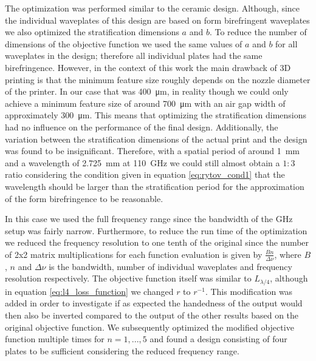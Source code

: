 The optimization was performed similar to the ceramic design. Although, since the individual waveplates of this design are based on form birefringent waveplates we also optimized the stratification dimensions $a$ and $b$. To reduce the number of dimensions of the objective function we used the same values of $a$ and $b$ for all waveplates in the design; therefore all individual plates had the same birefringence. However, in the context of this work the main drawback of 3D printing is that the minimum feature size roughly depends on the nozzle diameter of the printer. In our case that was \SI{400}{\micro \meter}, in reality though we could only achieve a minimum feature size of around \SI{700}{\micro \meter} with an air gap width of approximately \SI{300}{\micro \meter}. This means that optimizing the stratification dimensions had no influence on the performance of the final design. Additionally, the variation between the stratification dimensions of the actual print and the design was found to be insignificant. 
Therefore, with a spatial period of around \SI{1}{\milli \meter} and a wavelength of \SI{2.725}{\milli \meter} at \SI{110}{\giga \hertz} we could still almost obtain a $1:3$ ratio considering the condition given in equation \ref{eq:rytov_cond1} that the wavelength should be larger than the stratification period for the approximation of the form birefringence to be reasonable. 

In this case we used the full frequency range since the bandwidth of the GHz setup was fairly narrow. Furthermore, to reduce the run time of the optimization we reduced the frequency resolution to one tenth of the original since the number of 2x2 matrix multiplications for each function evaluation is given by $\frac{Bn}{\Delta \nu}$, where $B$, $n$ and $\Delta \nu$ is the bandwidth, number of individual waveplates and frequency resolution respectively. The objective function itself was similar to $L_{\lambda/4}$, although in equation \ref{eq:l4_loss_function} we changed $r$ to $r^{-1}$. This modification was added in order to investigate if as expected the handedness of the output would then also be inverted compared to the output of the other results based on the original objective function. We subsequently optimized the modified objective function multiple times for $n=1, ..., 5$ and found a design consisting of four plates to be sufficient considering the reduced frequency range. 

\begin{table}[ht]
    \centering
    
    \caption{Design parameters for result 3 obtained through the optimization of $L_{\lambda/4}$ for $n=4$. We used the full bandwidth of the GHz setup for the optimization.}
    \label{tab:res_hips_l4}
\end{table}

